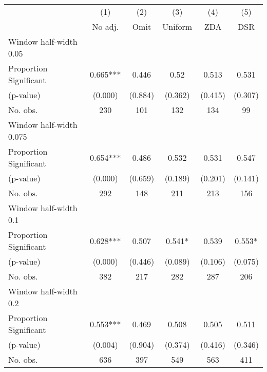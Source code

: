 
\def\sym#1{\ifmmode^{#1}\else\(^{#1}\)\fi}
\begin{tabular}{l*{5}{c}}
\hline\hline
& \multicolumn{1}{c}{(1)} &  \multicolumn{1}{c}{(2)} &  \multicolumn{1}{c}{(3)} &  \multicolumn{1}{c}{(4)} &  \multicolumn{1}{c}{(5)}\\
& \multicolumn{1}{c}{No adj.} &  \multicolumn{1}{c}{Omit} &  \multicolumn{1}{c}{Uniform} &  \multicolumn{1}{c}{ZDA} &  \multicolumn{1}{c}{DSR}\\

\hline
\hline
Window half-width 0.05\\

Proportion Significant& 0.665*** &  0.446 &  0.52 &  0.513 &  0.531\\

(p-value) & (0.000) &  (0.884) &  (0.362) &  (0.415) &  (0.307)\\

No. obs.& 230 &  101 &  132 &  134 &  99\\

\hline
Window half-width 0.075\\

Proportion Significant& 0.654*** &  0.486 &  0.532 &  0.531 &  0.547\\

(p-value) & (0.000) &  (0.659) &  (0.189) &  (0.201) &  (0.141)\\

No. obs.& 292 &  148 &  211 &  213 &  156\\

\hline
Window half-width 0.1\\

Proportion Significant& 0.628*** &  0.507 &  0.541* &  0.539 &  0.553*\\

(p-value) & (0.000) &  (0.446) &  (0.089) &  (0.106) &  (0.075)\\

No. obs.& 382 &  217 &  282 &  287 &  206\\

\hline
Window half-width 0.2\\

Proportion Significant& 0.553*** &  0.469 &  0.508 &  0.505 &  0.511\\

(p-value) & (0.004) &  (0.904) &  (0.374) &  (0.416) &  (0.346)\\

No. obs.& 636 &  397 &  549 &  563 &  411\\


\end{tabular}

